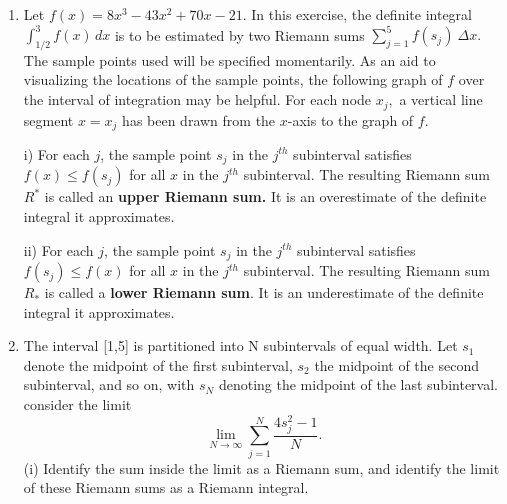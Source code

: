 \documentclass{article}
\begin{document}
\begin{enumerate}
    \item Let $f(x) = 8x^3 - 43x^2 + 70x - 21.$ In this exercise, the definite integral $\int_{1/2}^3 f(x) \, dx$ is to be estimated by two Riemann sums $\sum_{j=1}^5 f(s_j) \ \Delta x.$ The sample points used will be specified momentarily. As an aid to visualizing the locations of the sample points, the following graph of $f$ over the interval of integration may be helpful. For each node $x_j,$ a vertical line segment $x = x_j$ has been drawn from the $x$-axis to the graph of $f.$ \vspace{1em}

     \vspace{1em}

    i) For each $j$, the sample point $s_j$ in the $j^{th}$ subinterval satisfies $f(x) \leq f(s_j)$ for all $x$ in the $j^{th}$ subinterval. The resulting Riemann sum $R^*$ is called an \textbf{upper Riemann sum.} It is an overestimate of the definite integral it approximates. \vspace{1em}
    
    ii) For each $j$, the sample point $s_j$ in the $j^{th}$ subinterval satisfies $f(s_j) \leq f(x)$ for all $x$ in the $j^{th}$ subinterval. The resulting Riemann sum $R_*$ is called a \textbf{lower Riemann sum}. It is an underestimate of the definite integral it approximates.

    \item The interval [1,5] is partitioned into N subintervals of equal width. Let $s_1$ denote the midpoint of the first subinterval, $s_2$ the midpoint of the second subinterval, and so on, with $s_N$ denoting the midpoint of the last subinterval. consider the limit
    $$\lim_{N\to\infty}\sum_{j=1}^{N}\frac{4s_{j}^{2}-1}{N}.$$
    (i) Identify the sum inside the limit as a Riemann sum, and identify the limit of these Riemann sums as a Riemann integral.
    

\end{enumerate}
\end{document}
